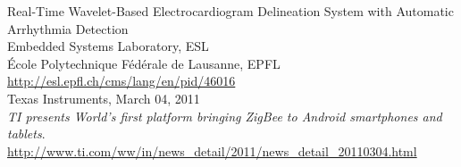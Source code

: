 \begin{thebibliography}{widest-label}

 	Real-Time Wavelet-Based Electrocardiogram Delineation System with Automatic Arrhythmia Detection\\
 	Embedded Systems Laboratory, ESL\\
 	École Polytechnique Fédérale de Lausanne, EPFL\\
 	\url{http://esl.epfl.ch/cms/lang/en/pid/46016}\\

 	Texas Instruments, March 04, 2011\\
 	\emph{TI presents World’s first platform bringing ZigBee to Android smartphones and tablets}.\\
 	\url{http://www.ti.com/ww/in/news_detail/2011/news_detail_20110304.html}\\




\end{thebibliography}
